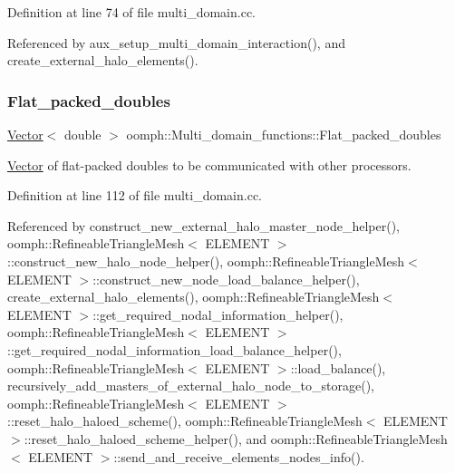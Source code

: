 Definition at line 74 of file multi\+\_\+domain.\+cc.



Referenced by aux\+\_\+setup\+\_\+multi\+\_\+domain\+\_\+interaction(), and create\+\_\+external\+\_\+halo\+\_\+elements().

\mbox{\label{namespaceoomph_1_1Multi__domain__functions_a2fa0a4a4e31700e161441b19f88c4bf3}} 
\subsubsection{\texorpdfstring{Flat\+\_\+packed\+\_\+doubles}{Flat\_packed\_doubles}}
{\footnotesize\ttfamily \hyperlink{classoomph_1_1Vector}{Vector}$<$ double $>$ oomph\+::\+Multi\+\_\+domain\+\_\+functions\+::\+Flat\+\_\+packed\+\_\+doubles}



\hyperlink{classoomph_1_1Vector}{Vector} of flat-\/packed doubles to be communicated with other processors. 



Definition at line 112 of file multi\+\_\+domain.\+cc.



Referenced by construct\+\_\+new\+\_\+external\+\_\+halo\+\_\+master\+\_\+node\+\_\+helper(), oomph\+::\+Refineable\+Triangle\+Mesh$<$ E\+L\+E\+M\+E\+N\+T $>$\+::construct\+\_\+new\+\_\+halo\+\_\+node\+\_\+helper(), oomph\+::\+Refineable\+Triangle\+Mesh$<$ E\+L\+E\+M\+E\+N\+T $>$\+::construct\+\_\+new\+\_\+node\+\_\+load\+\_\+balance\+\_\+helper(), create\+\_\+external\+\_\+halo\+\_\+elements(), oomph\+::\+Refineable\+Triangle\+Mesh$<$ E\+L\+E\+M\+E\+N\+T $>$\+::get\+\_\+required\+\_\+nodal\+\_\+information\+\_\+helper(), oomph\+::\+Refineable\+Triangle\+Mesh$<$ E\+L\+E\+M\+E\+N\+T $>$\+::get\+\_\+required\+\_\+nodal\+\_\+information\+\_\+load\+\_\+balance\+\_\+helper(), oomph\+::\+Refineable\+Triangle\+Mesh$<$ E\+L\+E\+M\+E\+N\+T $>$\+::load\+\_\+balance(), recursively\+\_\+add\+\_\+masters\+\_\+of\+\_\+external\+\_\+halo\+\_\+node\+\_\+to\+\_\+storage(), oomph\+::\+Refineable\+Triangle\+Mesh$<$ E\+L\+E\+M\+E\+N\+T $>$\+::reset\+\_\+halo\+\_\+haloed\+\_\+scheme(), oomph\+::\+Refineable\+Triangle\+Mesh$<$ E\+L\+E\+M\+E\+N\+T $>$\+::reset\+\_\+halo\+\_\+haloed\+\_\+scheme\+\_\+helper(), and oomph\+::\+Refineable\+Triangle\+Mesh$<$ E\+L\+E\+M\+E\+N\+T $>$\+::send\+\_\+and\+\_\+receive\+\_\+elements\+\_\+nodes\+\_\+info().

